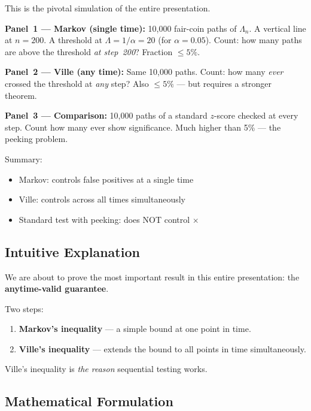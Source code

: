 \documentclass[12pt, a4paper]{article}
\newcommand{\LR}{\Lambda}              %
\begin{document}
\begin{simulation}
This is the pivotal simulation of the entire presentation.

\textbf{Panel~1 --- Markov (single time):}
10,000 fair-coin paths of $\LR_n$.  A vertical line at $n=200$.
A threshold at $\LR = 1/\alpha = 20$ (for $\alpha = 0.05$).
Count: how many paths are above the threshold \emph{at step~200}?
Fraction $\leq 5\%$.

\textbf{Panel~2 --- Ville (any time):}
Same 10,000 paths.  Count: how many \emph{ever} crossed the threshold at
\emph{any} step?  Also $\leq 5\%$ --- but requires a stronger theorem.

\textbf{Panel~3 --- Comparison:}
10,000 paths of a standard $z$-score checked at every step.  Count how many
ever show significance.  Much higher than 5\% --- the peeking problem.

Summary:
\begin{itemize}[nosep]
  \item Markov: controls false positives at a single time \checkmark
  \item Ville: controls across all times simultaneously \checkmark
  \item Standard test with peeking: does NOT control $\times$
\end{itemize}
\end{simulation}

\subsection{Intuitive Explanation}

\begin{intuition}
We are about to prove the most important result in this entire presentation:
the \textbf{anytime-valid guarantee}.

Two steps:
\begin{enumerate}[nosep]
  \item \textbf{Markov's inequality} --- a simple bound at one point in time.
  \item \textbf{Ville's inequality} --- extends the bound to all points in
        time simultaneously.
\end{enumerate}
Ville's inequality is \emph{the reason} sequential testing works.
\end{intuition}

\subsection{Mathematical Formulation}
\end{document}
